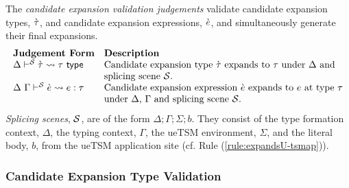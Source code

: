 The \emph{candidate expansion validation judgements} validate candidate expansion types, $\grave{\tau}$, and candidate expansion expressions, $\grave{e}$, and simultaneously generate their final expansions.
\[\begin{array}{ll}
\textbf{Judgement Form} & \textbf{Description}\\
\Delta\vdash^{\mathcal{S}} \grave{\tau} \leadsto \tau~\mathsf{type} & \text{Candidate expansion type $\grave{\tau}$ expands to $\tau$ under $\Delta$ and }\\
& \text{splicing scene $\mathcal{S}$.}\\
\Delta~\Gamma\vdash^{\mathcal{S}} \grave{e} \leadsto e : \tau & \text{Candidate expansion expression $\grave{e}$ expands to $e$ at type $\tau$}\\
& \text{under $\Delta$, $\Gamma$ and splicing scene $\mathcal{S}$.}
\end{array}\]
\emph{Splicing scenes}, $\mathcal{S}$, are of the form $\Delta; \Gamma; \Sigma; b$. They consist of the type formation context, $\Delta$, the typing context, $\Gamma$, the ueTSM environment, $\Sigma$, and the literal body, $b$, from the ueTSM application site (cf. Rule (\ref{rule:expandsU-tsmap})).

\subsubsection{Candidate Expansion Type Validation}


